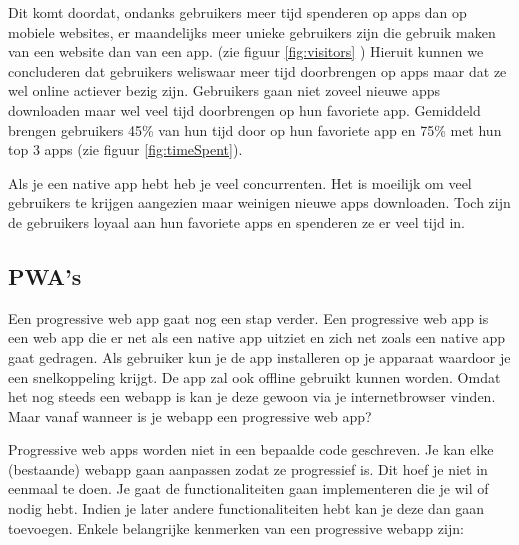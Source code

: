 Dit komt doordat, ondanks gebruikers meer tijd spenderen op apps dan op mobiele websites, er maandelijks meer unieke gebruikers zijn die gebruik maken van een website dan van een app. (zie figuur \ref{fig:visitors} ) Hieruit kunnen we concluderen dat gebruikers weliswaar meer tijd doorbrengen op apps maar dat ze wel online actiever bezig zijn. Gebruikers gaan niet zoveel nieuwe apps downloaden maar wel veel tijd doorbrengen op hun favoriete app. Gemiddeld brengen gebruikers 45\% van hun tijd door op hun favoriete app en 75\% met hun top 3 apps (zie figuur \ref{fig:timeSpent}).

Als je een native app hebt heb je veel concurrenten. Het is moeilijk om veel gebruikers te krijgen aangezien maar weinigen nieuwe apps downloaden. Toch zijn de gebruikers loyaal aan hun favoriete apps en spenderen ze er veel tijd in.


\subsection{PWA's}
Een progressive web app gaat nog een stap verder. Een progressive web app is een web app die er net als een native app uitziet en zich net zoals een native app gaat gedragen. Als gebruiker kun je de app installeren op je apparaat waardoor je een snelkoppeling krijgt. De app zal ook offline gebruikt kunnen worden. Omdat het nog steeds een webapp is kan je deze gewoon via je internetbrowser vinden. Maar vanaf wanneer is je webapp een progressive web app? 

Progressive web apps worden niet in een bepaalde code geschreven. Je kan elke (bestaande) webapp gaan aanpassen zodat ze progressief is. Dit hoef je niet in eenmaal te doen. Je gaat de functionaliteiten gaan implementeren die je wil of nodig hebt. Indien je later andere functionaliteiten hebt kan je deze dan gaan toevoegen.
Enkele belangrijke kenmerken van een progressive webapp zijn:

